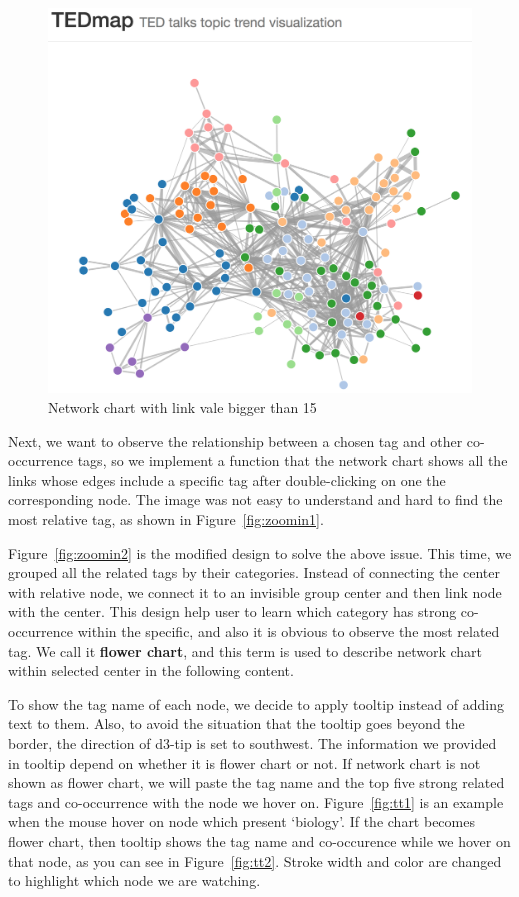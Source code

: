 \documentclass{report}
\numberwithin{figure}{section}
\begin{document}
\begin{figure}
\begin{center}
\includegraphics[scale=0.4]{networkChartProto}
\caption{Network chart with link vale bigger than 15}
\label{fig:networkwithcolor}
\end{center}
\end{figure}	

\quad Next, we want to observe the relationship between a chosen tag and other co-occurrence tags, so we implement a function that the network chart shows all the links whose edges include a specific tag after double-clicking on one the corresponding node. The image was not easy to understand and hard to find the most relative tag, as shown in Figure~\ref{fig:zoomin1}.

\quad Figure~\ref{fig:zoomin2} is the modified design to solve the above issue. This time, we grouped all the related tags by their categories. Instead of connecting the center with relative node, we connect it to an invisible group center and then link node with the center. This design help user to learn which category has strong co-occurrence within the specific, and also it is obvious to observe the most related tag. We call it \textbf{flower chart}, and this term is used to describe network chart within selected center in the following content.

\quad To show the tag name of each node, we decide to apply tooltip instead of adding text to them. Also, to avoid the situation that the tooltip goes beyond the border, the direction of d3-tip is set to southwest. The information we provided in tooltip depend on whether it is flower chart or not. If network chart is not shown as flower chart, we will paste the tag name and the top five strong related tags and co-occurrence with the node we hover on. Figure~\ref{fig:tt1} is an example when the mouse hover on node which present `biology'. If the chart becomes flower chart, then tooltip shows the tag name and co-occurence while we hover on that node, as you can see in Figure~\ref{fig:tt2}. Stroke width and color are changed to highlight which node we are watching.   
\end{document}
